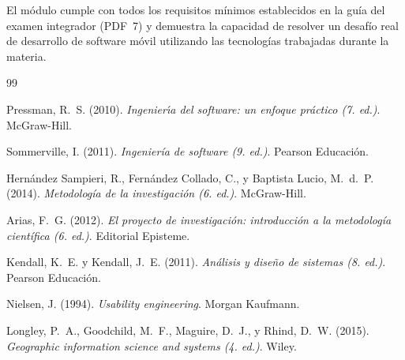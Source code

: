 \documentclass[12pt,letterpaper]{article}
\newcommand{\textoEncabezado}[2]{%
  \parbox{\headwidth}{\raggedleft
    \setstretch{1}%
    \textbf{#1}%
    \\[-6pt]{\rule{\headwidth}{0.4pt}}%
    \if\relax\detokenize{#2}\relax\else\\[2pt]\textbf{#2}\fi
  }%
}
\newcommand{\encabezadoCapitulo}[2]{%
  \fancyhead[C]{\textoEncabezado{#1}{#2}}%
}
\begin{document}
El m\'odulo cumple con todos los requisitos m\'inimos establecidos
en la gu\'ia del examen integrador (PDF~7) y demuestra la
capacidad de resolver un desaf\'io real de desarrollo de software
m\'ovil utilizando las tecnolog\'ias trabajadas durante la materia.

\newpage
\encabezadoCapitulo{REFERENCIAS}{}


\nocite{*}

\begin{thebibliography}{99}

Pressman, R.~S. (2010). \textit{Ingenier{\'\i}a del software: un enfoque pr\'actico (7.{\textordfeminine} ed.)}. McGraw-Hill.

Sommerville, I. (2011). \textit{Ingenier\'ia de software (9.{\textordfeminine} ed.)}. Pearson Educaci\'on.

Hern\'andez Sampieri, R., Fern\'andez Collado, C., y Baptista Lucio, M.~d.~P. (2014). \textit{Metodolog\'ia de la investigaci\'on (6.{\textordfeminine} ed.)}. McGraw-Hill.

Arias, F.~G. (2012). \textit{El proyecto de investigaci\'on: introducci\'on a la metodolog\'ia cient\'ifica (6.{\textordfeminine} ed.)}. Editorial Episteme.

Kendall, K.~E. y Kendall, J.~E. (2011). \textit{An\'alisis y dise\~no de sistemas (8.{\textordfeminine} ed.)}. Pearson Educaci\'on.

Nielsen, J. (1994). \textit{Usability engineering}. Morgan Kaufmann.

Longley, P.~A., Goodchild, M.~F., Maguire, D.~J., y Rhind, D.~W. (2015). \textit{Geographic information science and systems (4.{\textordfeminine} ed.)}. Wiley.


\end{thebibliography}
\end{document}
